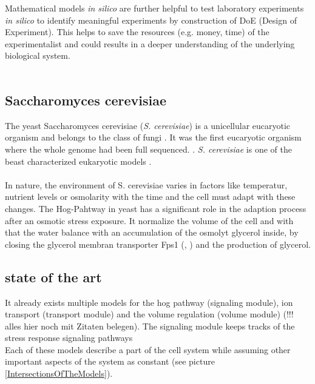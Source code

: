 Mathematical models \textit{in silico} are further helpful to test laboratory experiments \textit{in silico} to identify meaningful experiments by construction of DoE (Design of Experiment). This helps to save the resources (e.g. money, time) of the experimentalist and could results in a deeper understanding of the underlying biological system.\\\\

\subsection{Saccharomyces cerevisiae}
The yeast Saccharomyces cerevisiae (\emph{S. cerevisiae}) is a unicellular eucaryotic organism and belongs to the class of fungi \cite{Feyder2015}. It was the first eucaryotic organism where the whole genome had been full sequenced. \cite{goffeau1996life}. \emph{S. cerevisiae} is one of the beast characterized eukaryotic models \cite{Feyder2015}.\\\\
In nature, the environment of S. cerevisiae varies in factors like temperatur, nutrient levels or osmolarity with the time and the cell must adapt with these changes. \cite{JannisUhlendorf} The Hog-Pahtway in yeast has a significant role in the adaption process after an osmotic stress exposure. It normalize the volume of the cell and with that the water balance with an accumulation of the osmolyt glycerol inside, by closing the glycerol membran transporter Fps1 (\cite{Saito2012},  \cite{ASimpleMathematicalModel}) and the production of glycerol.  

\subsection{state of the art}
It already exists multiple models for the hog pathway (signaling module), ion transport (transport module) and the volume regulation (volume module) (!!! alles hier noch mit Zitaten belegen). The signaling module keeps tracks of the stress response signaling pathways \\
Each of these models describe a part of the cell system while assuming other important aspects of the system as constant (see picture \ref{IntersectionsOfTheModels}).

